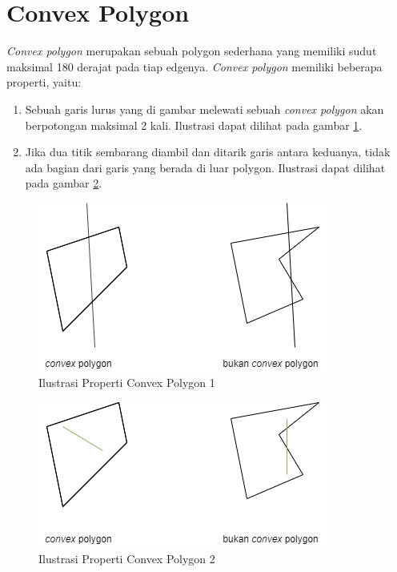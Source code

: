 \section{Convex Polygon}
\textit{Convex polygon} merupakan sebuah polygon sederhana yang memiliki sudut maksimal 180 derajat pada tiap edgenya. \textit{Convex polygon} memiliki beberapa properti, yaitu:
\begin{enumerate}
    \item Sebuah garis lurus yang di gambar melewati sebuah \textit{convex polygon} akan berpotongan maksimal 2 kali. Ilustrasi dapat dilihat pada gambar \ref{fig:ilustrasi-properti-convex-polygon-1}.
    \item Jika dua titik sembarang diambil dan ditarik garis antara keduanya, tidak ada bagian dari garis yang berada di luar polygon. Ilustrasi dapat dilihat pada gambar \ref{fig:ilustrasi-properti-convex-polygon-2}.
\end{enumerate}
\begin{figure}[!h]
    \Centering
    \includegraphics[width=0.5\columnwidth]{bab2/img/ilustrasi-properti-convex-polygon-1}
    \caption{Ilustrasi Properti Convex Polygon 1}
    \label{fig:ilustrasi-properti-convex-polygon-1}
\end{figure}
\begin{figure}[!h]
    \Centering
    \includegraphics[width=0.5\columnwidth]{bab2/img/ilustrasi-properti-convex-polygon-2}
    \caption{Ilustrasi Properti Convex Polygon 2}
    \label{fig:ilustrasi-properti-convex-polygon-2}
\end{figure}

